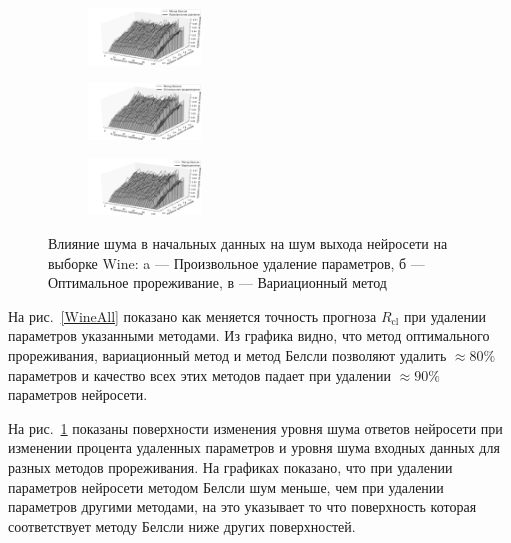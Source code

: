 \begin{figure}[ht]\center
\begin{subfigure}[а]{0.33\textwidth}
\includegraphics[width=0.33\textwidth]{plots/grabovoy/wine_random_noise3d.pdf}
\end{subfigure}
\begin{subfigure}[б]{0.33\textwidth}
{\includegraphics[width=0.33\textwidth]{plots/grabovoy/obd_noise_3d.pdf}}
\end{subfigure}
\begin{subfigure}[в]{0.33\textwidth}
{\includegraphics[width=0.33\textwidth]{plots/grabovoy/var_noise_3d.pdf}}
\end{subfigure}

\caption{Влияние шума в начальных данных на шум выхода нейросети на выборке Wine: a --- Произвольное удаление параметров, б --- Оптимальное прореживание, в --- Вариационный метод}
\label{WineNoise}
\end{figure}

На рис.~\ref{WineAll} показано как меняется точность прогноза $R_{\text{cl}}$ при удалении параметров указанными методами. Из графика видно, что метод оптимального прореживания, вариационный метод и метод Белсли позволяют удалить $\approx80\%$ параметров и качество всех этих методов падает при удалении $\approx90\%$ параметров нейросети. 

На рис.~\ref{WineNoise} показаны поверхности изменения уровня шума ответов нейросети при изменении процента удаленных параметров и уровня шума входных данных для разных методов прореживания. На графиках показано, что при удалении параметров нейросети методом Белсли шум меньше, чем при удалении параметров другими методами, на это указывает то что поверхность которая соответствует методу Белсли ниже других поверхностей.

